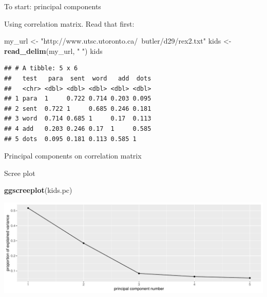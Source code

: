 \documentclass[
  ignorenonframetext,
]{beamer}
\newenvironment{Shaded}{\begin{snugshade}}{\end{snugshade}}
\newcommand{\DataTypeTok}[1]{\textcolor[rgb]{0.13,0.29,0.53}{#1}}
\newcommand{\KeywordTok}[1]{\textcolor[rgb]{0.13,0.29,0.53}{\textbf{#1}}}
\newcommand{\NormalTok}[1]{#1}
\newcommand{\OperatorTok}[1]{\textcolor[rgb]{0.81,0.36,0.00}{\textbf{#1}}}
\newcommand{\StringTok}[1]{\textcolor[rgb]{0.31,0.60,0.02}{#1}}
\begin{document}
\begin{frame}[fragile]{To start: principal components}
\protect\hypertarget{to-start-principal-components}{}

Using correlation matrix. Read that first:

\begin{Shaded}
\begin{Highlighting}[]
\NormalTok{my_url <-}\StringTok{ "http://www.utsc.utoronto.ca/~butler/d29/rex2.txt"}
\NormalTok{kids <-}\StringTok{ }\KeywordTok{read_delim}\NormalTok{(my_url, }\StringTok{" "}\NormalTok{)}
\NormalTok{kids}
\end{Highlighting}
\end{Shaded}

\begin{verbatim}
## # A tibble: 5 x 6
##   test   para  sent  word   add  dots
##   <chr> <dbl> <dbl> <dbl> <dbl> <dbl>
## 1 para  1     0.722 0.714 0.203 0.095
## 2 sent  0.722 1     0.685 0.246 0.181
## 3 word  0.714 0.685 1     0.17  0.113
## 4 add   0.203 0.246 0.17  1     0.585
## 5 dots  0.095 0.181 0.113 0.585 1
\end{verbatim}

\end{frame}

\begin{frame}[fragile]{Principal components on correlation matrix}
\protect\hypertarget{principal-components-on-correlation-matrix}{}

\begin{Shaded}
\end{Shaded}

\end{frame}

\begin{frame}[fragile]{Scree plot}
\protect\hypertarget{scree-plot-3}{}

\begin{Shaded}
\begin{Highlighting}[]
\KeywordTok{ggscreeplot}\NormalTok{(kids.pc)}
\end{Highlighting}
\end{Shaded}

\includegraphics{slides_d29_files/figure-beamer/unnamed-chunk-445-1.pdf}

\end{frame}
\end{document}
